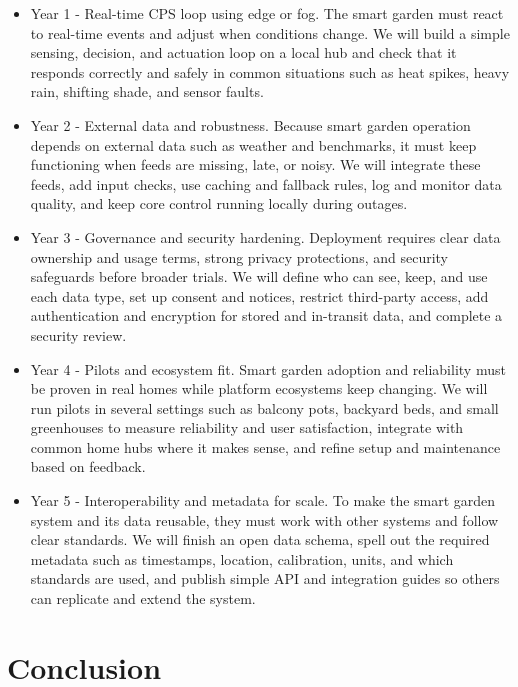 \documentclass{sigchi}
\begin{document}
\begin{itemize}

\item Year 1 - Real-time CPS loop using edge or fog. The smart garden must react to real-time events and adjust when conditions change. We will build a simple sensing, decision, and actuation loop on a local hub and check that it responds correctly and safely in common situations such as heat spikes, heavy rain, shifting shade, and sensor faults.

\item Year 2 - External data and robustness. Because smart garden operation depends on external data such as weather and benchmarks, it must keep functioning when feeds are missing, late, or noisy. We will integrate these feeds, add input checks, use caching and fallback rules, log and monitor data quality, and keep core control running locally during outages.

\item Year 3 - Governance and security hardening. Deployment requires clear data ownership and usage terms, strong privacy protections, and security safeguards before broader trials. We will define who can see, keep, and use each data type, set up consent and notices, restrict third-party access, add authentication and encryption for stored and in-transit data, and complete a security review.

\item Year 4 - Pilots and ecosystem fit. Smart garden adoption and reliability must be proven in real homes while platform ecosystems keep changing. We will run pilots in several settings such as balcony pots, backyard beds, and small greenhouses to measure reliability and user satisfaction, integrate with common home hubs where it makes sense, and refine setup and maintenance based on feedback.

\item Year 5 - Interoperability and metadata for scale. To make the smart garden system and its data reusable, they must work with other systems and follow clear standards. We will finish an open data schema, spell out the required metadata such as timestamps, location, calibration, units, and which standards are used, and publish simple API and integration guides so others can replicate and extend the system.

\end{itemize}

\section{Conclusion}
\end{document}
